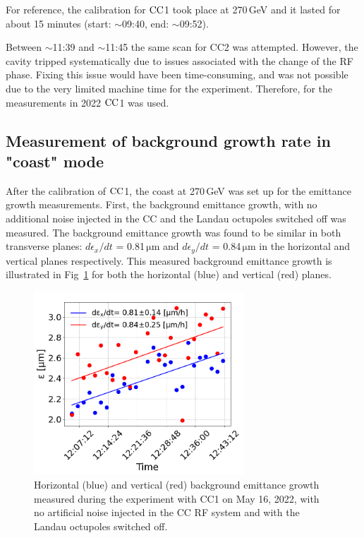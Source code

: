
For reference, the calibration for ${\mathrm{CC}}$1 took place at 270\,GeV and it lasted for about 15 minutes (start: $\sim$09:40, end: $\sim$09:52).

Between $\sim$11:39 and $\sim$11:45 the same scan for CC2 was attempted. However, the cavity tripped systematically due to issues associated with the change of the RF phase. Fixing this issue would have been time-consuming, and was not possible due to the very limited machine time for the experiment. Therefore, for the measurements in 2022 ${\mathrm{CC}}$1 was used.


\subsection{Measurement of background growth rate in "coast" mode}\label{subsec:measured_background_growth_cc_md_2022}
After the calibration of ${\mathrm{CC}}$1, the coast at 270\,GeV was set up for the emittance growth measurements. First, the background emittance growth, with no additional noise injected in the CC and the Landau octupoles switched off was measured. The background emittance growth was found to be similar in both transverse planes: $d\epsilon_x /dt$ = 0.81\,$\mathrm{\mu m}$ and $d\epsilon_y /dt$ = 0.84\,$\mathrm{\mu m}$ in the horizontal and vertical planes respectively. This measured background emittance growth is illustrated in Fig~\ref{fig:cc_md_2022_background_growth_in_scan} for both the horizontal (blue) and vertical (red) planes.

\begin{figure}[!h] %
   \centering         
   \includegraphics[width=0.7\textwidth]{images/Ch8/cc_md_2022_background_in_scan.png}
       \caption{Horizontal (blue) and vertical (red) background emittance growth measured during the experiment with CC1 on May 16, 2022, with no artificial noise injected in the CC RF system and with the Landau octupoles switched off.}
       \label{fig:cc_md_2022_background_growth_in_scan}
\end{figure}

